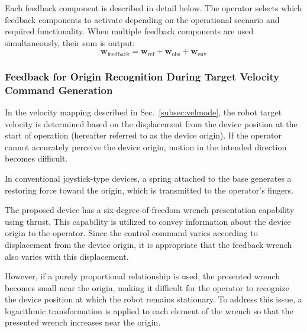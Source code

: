\documentclass{WileyMSP-template}
\begin{document}
Each feedback component is described in detail below.  
The operator selects which feedback components to activate depending on the operational scenario and required functionality.  
When multiple feedback components are used simultaneously, their sum is output:
\begin{equation}
  \bm{w}_{\text{feedback}} = \bm{w}_{\text{ref}} + \bm{w}_{\text{obs}} + \bm{w}_{\text{env}}
\end{equation}

\subsubsection{Feedback for Origin Recognition During Target Velocity Command Generation}\label{subsec:feedback_in_velmode}

In the velocity mapping described in Sec.~\ref{subsec:velmode}, the robot target velocity is determined based on the displacement from the device position at the start of operation (hereafter referred to as the device origin).  
If the operator cannot accurately perceive the device origin, motion in the intended direction becomes difficult.

In conventional joystick-type devices, a spring attached to the base generates a restoring force toward the origin, which is transmitted to the operator’s fingers.

The proposed device has a six-degree-of-freedom wrench presentation capability using thrust.  
This capability is utilized to convey information about the device origin to the operator.  
Since the control command varies according to displacement from the device origin, it is appropriate that the feedback wrench also varies with this displacement.

However, if a purely proportional relationship is used, the presented wrench becomes small near the origin, making it difficult for the operator to recognize the device position at which the robot remains stationary.  
To address this issue, a logarithmic transformation is applied to each element of the wrench so that the presented wrench increases near the origin.
\end{document}
